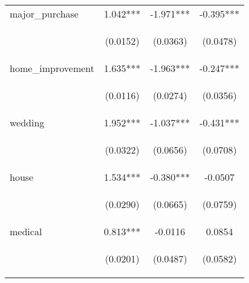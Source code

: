 \begin{center}
\begin{tabular}{lccc}
major\_purchase & 1.042*** & -1.971*** & -0.395*** \\
\vspace{4pt} & \begin{footnotesize}(0.0152)\end{footnotesize} & \begin{footnotesize}(0.0363)\end{footnotesize} & \begin{footnotesize}(0.0478)\end{footnotesize} \\
home\_improvement & 1.635*** & -1.963*** & -0.247*** \\
\vspace{4pt} & \begin{footnotesize}(0.0116)\end{footnotesize} & \begin{footnotesize}(0.0274)\end{footnotesize} & \begin{footnotesize}(0.0356)\end{footnotesize} \\
wedding & 1.952*** & -1.037*** & -0.431*** \\
\vspace{4pt} & \begin{footnotesize}(0.0322)\end{footnotesize} & \begin{footnotesize}(0.0656)\end{footnotesize} & \begin{footnotesize}(0.0708)\end{footnotesize} \\
house & 1.534*** & -0.380*** & -0.0507 \\
\vspace{4pt} & \begin{footnotesize}(0.0290)\end{footnotesize} & \begin{footnotesize}(0.0665)\end{footnotesize} & \begin{footnotesize}(0.0759)\end{footnotesize} \\
medical & 0.813*** & -0.0116 & 0.0854 \\
\vspace{4pt} & \begin{footnotesize}(0.0201)\end{footnotesize} & \begin{footnotesize}(0.0487)\end{footnotesize} & \begin{footnotesize}(0.0582)\end{footnotesize} \\

\end{tabular}
\end{center}

